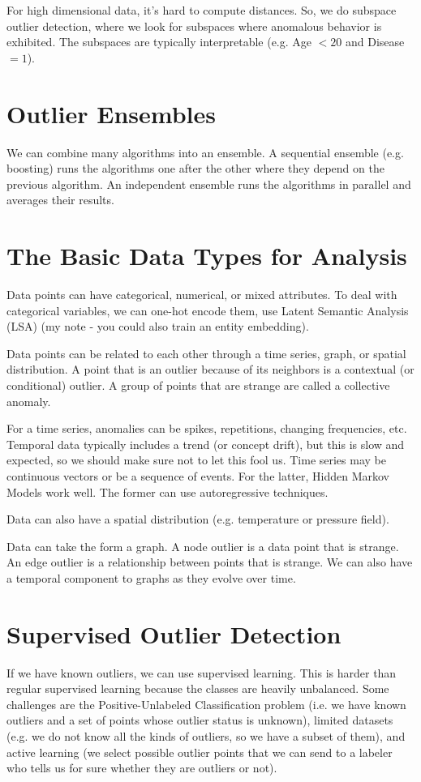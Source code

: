 \documentclass[a4paper]{article}
\begin{document}
For high dimensional data, it's hard to compute distances. So, we do subspace
outlier detection, where we look for subspaces where anomalous behavior is
exhibited. The subspaces are typically interpretable (e.g. Age $< 20$ and
Disease $= 1$).

\section{Outlier Ensembles}
We can combine many algorithms into an ensemble. A sequential ensemble (e.g.
boosting) runs the algorithms one after the other where they depend on the
previous algorithm. An independent ensemble runs the algorithms in parallel
and averages their results.

\section{The Basic Data Types for Analysis}
Data points can have categorical, numerical, or mixed attributes. To deal
with categorical variables, we can one-hot encode them, use Latent Semantic
Analysis (LSA) (my note - you could also train an entity embedding).

Data points can be related to each other through a time series, graph, or
spatial distribution. A point that is an outlier because of its neighbors is a
contextual (or conditional) outlier. A group of points that are strange are
called a collective anomaly.

For a time series, anomalies can be spikes, repetitions, changing frequencies,
etc. Temporal data typically includes a trend (or concept drift), but this is
slow and expected, so we should make sure not to let this fool us. Time series
may be continuous vectors or be a sequence of events. For the latter, Hidden
Markov Models work well. The former can use autoregressive techniques.

Data can also have a spatial distribution (e.g. temperature or pressure field).

Data can take the form a graph. A node outlier is a data point that is strange.
An edge outlier is a relationship between points that is strange. We can also
have a temporal component to graphs as they evolve over time.

\section{Supervised Outlier Detection}
If we have known outliers, we can use supervised learning. This is harder than
regular supervised learning because the classes are heavily unbalanced. Some
challenges are the Positive-Unlabeled Classification problem (i.e. we have known
outliers and a set of points whose outlier status is unknown), limited datasets
(e.g. we do not know all the kinds of outliers, so we have a subset of them),
and active learning (we select possible outlier points that we can send to a
labeler who tells us for sure whether they are outliers or not).
\end{document}
